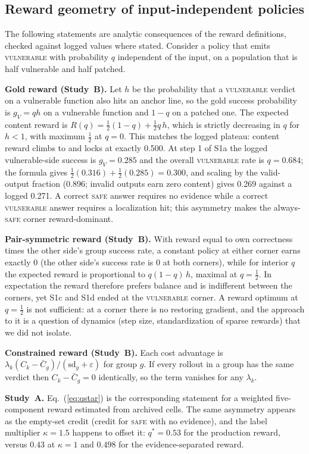\documentclass[journal]{IEEEtran}
\newcommand{\vuln}{\textsc{vulnerable}}
\newcommand{\safe}{\textsc{safe}}
\begin{document}
\subsection{Reward geometry of input-independent policies}
\label{sec:geometry}
The following statements are analytic consequences of the reward definitions, checked against logged values where stated. Consider a policy that emits \vuln{} with probability $q$ independent of the input, on a population that is half vulnerable and half patched.

\textbf{Gold reward (Study~B).} Let $h$ be the probability that a \vuln{} verdict on a vulnerable function also hits an anchor line, so the gold success probability is $g_V=qh$ on a vulnerable function and $1-q$ on a patched one. The expected content reward is $R(q)=\tfrac12(1-q)+\tfrac12 q\,h$, which is strictly decreasing in $q$ for $h<1$, with maximum $\tfrac12$ at $q{=}0$. This matches the logged plateau: content reward climbs to and locks at exactly 0.500. At step 1 of S1a the logged vulnerable-side success is $g_V{=}0.285$ and the overall \vuln{} rate is $q{=}0.684$; the formula gives $\tfrac12(0.316)+\tfrac12(0.285)=0.300$, and scaling by the valid-output fraction (0.896; invalid outputs earn zero content) gives 0.269 against a logged 0.271. A correct \safe{} answer requires no evidence while a correct \vuln{} answer requires a localization hit; this asymmetry makes the always-\safe{} corner reward-dominant.

\textbf{Pair-symmetric reward (Study~B).} With reward equal to own correctness times the other side's group success rate, a constant policy at either corner earns exactly 0 (the other side's success rate is 0 at both corners), while for interior $q$ the expected reward is proportional to $q(1-q)\,h$, maximal at $q{=}\tfrac12$. In expectation the reward therefore prefers balance and is indifferent between the corners, yet S1c and S1d ended at the \vuln{} corner. A reward optimum at $q{=}\tfrac12$ is not sufficient: at a corner there is no restoring gradient, and the approach to it is a question of dynamics (step size, standardization of sparse rewards) that we did not isolate.

\textbf{Constrained reward (Study~B).} Each cost advantage is $\lambda_k(C_k-\bar C_g)/(\mathrm{sd}_g+\varepsilon)$ for group $g$. If every rollout in a group has the same verdict then $C_k-\bar C_g=0$ identically, so the term vanishes for any $\lambda_k$.

\textbf{Study~A.} Eq.~(\ref{eq:qstar}) is the corresponding statement for a weighted five-component reward estimated from archived cells. The same asymmetry appears as the empty-set credit (credit for \safe{} with no evidence), and the label multiplier $\kappa{=}1.5$ happens to offset it: $q^*{=}0.53$ for the production reward, versus $0.43$ at $\kappa{=}1$ and $0.498$ for the evidence-separated reward.
\end{document}
